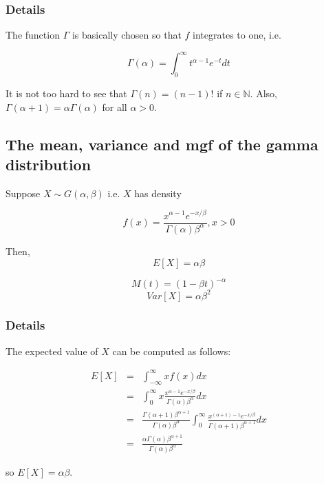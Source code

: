 \documentclass[12pt,a4paper]{article}
\theoremstyle{regla}
\theoremstyle{remark}
\theoremstyle{definition}
\theoremstyle{nonumberbreak}
\begin{document}
\subsubsection{Details}
The function $\Gamma$ is basically chosen so that $f$ integrates to one, i.e.


$$\Gamma(\alpha) = \int_0^\infty t^{\alpha-1} e^{-t}dt$$

It is not too hard to see that $\Gamma(n)=(n-1)!$ if $n \in \mathbb{N}$. Also, $\Gamma(\alpha + 1) = \alpha \Gamma(\alpha)$ for all $\alpha >0$.


\subsection{The mean, variance and mgf of the gamma distribution}
\begin{fbox}
\begin{minipage}{0.97\textwidth}
Suppose $X \sim G (\alpha, \beta)$ i.e. $X$ has density

$$ f(x) = \frac{x^{\alpha -1} e^{-x/\beta}} {\Gamma (\alpha) \beta^{\alpha}} , x > 0  $$

Then,
$$E[X] = \alpha\beta$$

$$M(t) = (1-\beta t)^{-\alpha}$$ $$

Var[X] = \alpha \beta^2  $$

\end{minipage}
\end{fbox}
\subsubsection{Details}
The expected value of $X$ can be computed as follows:

\begin{eqnarray*}
E[X] & = & \int_{-\infty}^{\infty} xf(x)dx \\
 & = & \int_{0}^{\infty} x \frac{x^{\alpha -1} e^{-x/\beta}} {\Gamma (\alpha) \beta^{\alpha}} dx \\
 & = & \frac{\Gamma(\alpha+1)\beta^{\alpha+1}}{\Gamma(\alpha)\beta^{\alpha}} \int_{0}^{\infty}  \frac{x^{(\alpha+1) -1} e^{-x/\beta}} {\Gamma (\alpha+1) \beta^{\alpha+1}} dx\\
 & = & \frac{\alpha\Gamma(\alpha)\beta^{\alpha+1}}{\Gamma(\alpha)\beta^{\alpha}} 
\end{eqnarray*} 

so $E[X] = \alpha\beta$. \\
\end{document}
